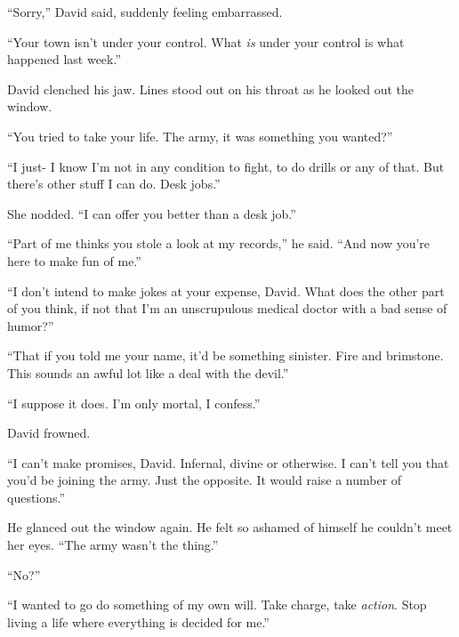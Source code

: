 ``Sorry,'' David said, suddenly feeling embarrassed.



``Your town isn't under your control.  What \emph{is} under your control is what happened last week.''



David clenched his jaw.  Lines stood out on his throat as he looked out the window.



``You tried to take your life.  The army, it was something you wanted?''



``I just- I know I'm not in any condition to fight, to do drills or any of that.  But there's other stuff I can do.  Desk jobs.''



She nodded.  ``I can offer you better than a desk job.''



``Part of me thinks you stole a look at my records,'' he said.  ``And now you're here to make fun of me.''



``I don't intend to make jokes at your expense, David.  What does the other part of you think, if not that I'm an unscrupulous medical doctor with a bad sense of humor?''



``That if you told me your name, it'd be something sinister.  Fire and brimstone.  This sounds an awful lot like a deal with the devil.''



``I suppose it does.  I'm only mortal, I confess.''



David frowned.



``I can't make promises, David.  Infernal, divine or otherwise.  I can't tell you that you'd be joining the army.  Just the opposite.  It would raise a number of questions.''



He glanced out the window again.  He felt so ashamed of himself he couldn't meet her eyes.  ``The army wasn't the thing.''



``No?''



``I wanted to go do something of my own will.  Take charge, take \emph{action}.  Stop living a life where everything is decided for me.''



